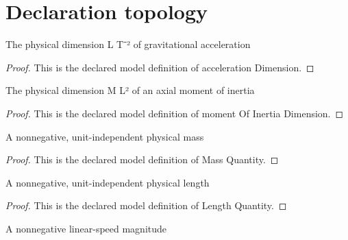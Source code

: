 \section{Declaration topology}
\begin{definition}
  \label{def:physics:phyx-mini-0821:phyxminiproblems-problemphyxmini0821-accelerationdimension}
  The physical dimension L T⁻² of gravitational acceleration
\end{definition}
\begin{proof}
  This is the declared model definition of acceleration Dimension.
\end{proof}
\begin{definition}
  \label{def:physics:phyx-mini-0821:phyxminiproblems-problemphyxmini0821-momentofinertiadimension}
  The physical dimension M L² of an axial moment of inertia
\end{definition}
\begin{proof}
  This is the declared model definition of moment Of Inertia Dimension.
\end{proof}
\begin{definition}
  \label{def:physics:phyx-mini-0821:phyxminiproblems-problemphyxmini0821-massquantity}
  A nonnegative, unit-independent physical mass
\end{definition}
\begin{proof}
  This is the declared model definition of Mass Quantity.
\end{proof}
\begin{definition}
  \label{def:physics:phyx-mini-0821:phyxminiproblems-problemphyxmini0821-lengthquantity}
  A nonnegative, unit-independent physical length
\end{definition}
\begin{proof}
  This is the declared model definition of Length Quantity.
\end{proof}
\begin{definition}
  \label{def:physics:phyx-mini-0821:phyxminiproblems-problemphyxmini0821-speedquantity}
  A nonnegative linear-speed magnitude
\end{definition}
